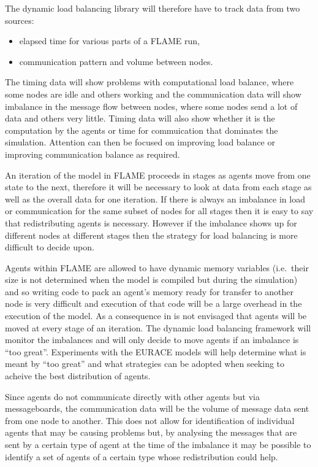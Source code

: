 The dynamic load balancing library will therefore have to track data from two sources:

\begin{itemize}
	\item elapsed time for various parts of a FLAME run,
	\item communication pattern and volume between nodes.
\end{itemize}

The timing data will show problems with computational load balance, where some nodes are idle and others working and the communication data will show imbalance in the message flow between nodes, where some nodes send a lot of data and others very little. Timing data will also show whether it is the computation by the agents or time for commuication that dominates the simulation. Attention can then be focused on improving load balance or improving communication balance as required.

An iteration of the model in FLAME proceeds in stages as agents move from one state to the next, therefore it will be necessary to look at data from each stage as well as the overall data for one iteration. If there is always an imbalance in load or communication for the same subset of nodes for all stages then it is easy to say that redistributing agents is necessary. However if the imbalance shows up for different nodes at different stages then the strategy for load balancing is more difficult to decide upon. 

Agents within FLAME are allowed to have dynamic memory variables (i.e.\ their size is not determined when the model is compiled but during the simulation) and so writing code to pack an agent's memory ready for transfer to another node is very difficult and execution of that code will be a large overhead in the execution of the model. As a consequence in is not envisaged that agents will be moved at every stage of an iteration. The dynamic load balancing framework will monitor the imbalances and will only decide to move agents if an imbalance is ``too great''. Experiments with the EURACE models will help determine what is meant by ``too great'' and what strategies can be adopted when seeking to acheive the best distribution of agents.

Since agents do not communicate directly with other agents but via messageboards, the communication data will be the volume of message data sent from one node to another. This does not allow for identification of individual agents that may be causing problems but, by analysing the messages that are sent by a certain type of agent at the time of the imbalance it may be possible to identify a set of agents of a certain type whose redistribution could help.

